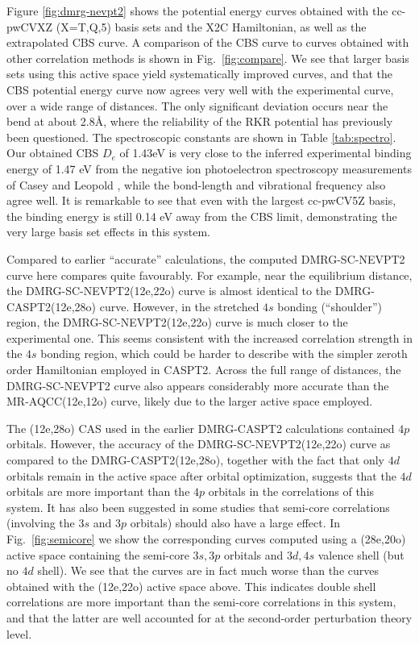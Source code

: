 Figure \ref{fig:dmrg-nevpt2} shows the potential energy curves obtained with the cc-pwCVXZ (X=T,Q,5) basis sets and the X2C Hamiltonian, as well as the extrapolated
CBS curve. A comparison of the CBS curve to curves obtained with other
correlation methods is shown in Fig.~\ref{fig:compare}.
We see that larger basis sets using this active space yield systematically improved curves, and that
the CBS potential energy curve now agrees very well with the experimental curve, over a wide range of distances. The only significant deviation occurs near the bend at about 2.8\AA, where the reliability of the RKR potential  has previously been questioned.\cite{roos_ground_2003}
The spectroscopic constants are shown in Table \ref{tab:spectro}.
Our obtained CBS $D_e$ of 1.43eV is very close to the inferred experimental binding energy of 1.47 eV from
the negative ion photoelectron spectroscopy measurements
of Casey and Leopold \cite{casey_negative_1993}, while the bond-length and vibrational frequency also agree well. It is remarkable to see that even
with the largest cc-pwCV5Z basis, the binding energy is still 0.14 eV away from the CBS limit,  demonstrating the very large basis set 
effects in this system.  

Compared to earlier ``accurate'' calculations, the computed DMRG-SC-NEVPT2 curve 
here compares  quite favourably. For example, near the equilibrium
distance, the DMRG-SC-NEVPT2(12e,22o) curve is almost identical to the DMRG-CASPT2(12e,28o) curve\cite{kurashige_second-order_2011}. However, in the stretched $4s$ bonding (``shoulder'') region, the DMRG-SC-NEVPT2(12e,22o) curve is much closer to the experimental one. This seems consistent with the increased correlation strength in the $4s$ bonding region, which could be harder to describe with the simpler zeroth order Hamiltonian employed in CASPT2. Across the full range of distances, the DMRG-SC-NEVPT2 curve also appears considerably more accurate than the MR-AQCC(12e,12o) curve, likely due to the larger active space employed.

The (12e,28o) CAS used in the earlier DMRG-CASPT2 calculations 
contained $4p$ orbitals. However, the accuracy of the DMRG-SC-NEVPT2(12e,22o) curve as compared to the DMRG-CASPT2(12e,28o), together with the fact that only $4d$ orbitals remain in the active space after orbital optimization, suggests that the $4d$ orbitals are more important than the $4p$ orbitals in the correlations of this system. It has also been suggested in some studies
that semi-core correlations (involving the $3s$ and $3p$ orbitals) should also have  a large effect. In Fig.~\ref{fig:semicore} we show the corresponding curves
computed using a (28e,20o) active space containing the semi-core $3s, 3p$ orbitals and $3d, 4s$ valence shell (but no $4d$ shell). We see that the curves are in fact much worse than the curves obtained with the (12e,22o) active space above. This 
indicates double shell correlations are more important than 
the semi-core correlations in this system, and that the latter are well accounted for at the second-order perturbation theory level.

